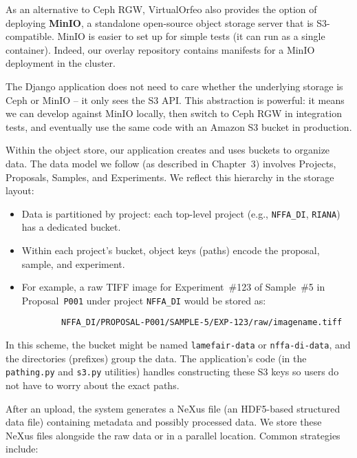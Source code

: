 \medskip

As an alternative to Ceph RGW, VirtualOrfeo also provides the option of deploying 
\textbf{MinIO}, a standalone open-source object storage server that is 
S3-compatible. MinIO is easier to set up for simple tests (it can run as a 
single container). Indeed, our overlay repository contains manifests for a MinIO 
deployment in the cluster.  

The Django application does not need to care whether the underlying storage is 
Ceph or MinIO – it only sees the S3 API. This abstraction is powerful: it means 
we can develop against MinIO locally, then switch to Ceph RGW in integration 
tests, and eventually use the same code with an Amazon S3 bucket in production.

\medskip

Within the object store, our application creates and uses buckets to organize 
data. The data model we follow (as described in Chapter~3) involves Projects, 
Proposals, Samples, and Experiments. We reflect this hierarchy in the storage 
layout:  

\begin{itemize}
	\item Data is partitioned by project: each top-level project 
	(e.g., \texttt{NFFA\_DI}, \texttt{RIANA}) has a dedicated bucket.  
	\item Within each project’s bucket, object keys (paths) encode the proposal, 
	sample, and experiment.  
	\item For example, a raw TIFF image for Experiment~\#123 of Sample~\#5 in 
	Proposal~\texttt{P001} under project \texttt{NFFA\_DI} would be stored as:  
	\begin{verbatim}
		NFFA_DI/PROPOSAL-P001/SAMPLE-5/EXP-123/raw/imagename.tiff
	\end{verbatim}
\end{itemize}

In this scheme, the bucket might be named \texttt{lamefair-data} or 
\texttt{nffa-di-data}, and the directories (prefixes) group the data. The 
application’s code (in the \texttt{pathing.py} and \texttt{s3.py} utilities) 
handles constructing these S3 keys so users do not have to worry about the exact 
paths.

\medskip

After an upload, the system generates a NeXus file (an HDF5-based structured data 
file) containing metadata and possibly processed data. We store these NeXus files 
alongside the raw data or in a parallel location. Common strategies include:  

